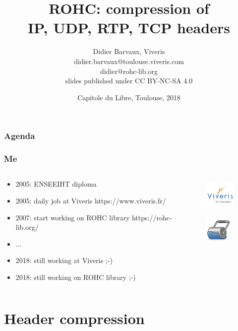 \documentclass[utf8]{beamer}
\title{ROHC: compression of \\IP, UDP, RTP, TCP headers}
\author[Viveris]{Didier Barvaux, Viveris \\ {\tiny didier.barvaux@toulouse.viveris.com} \\ {\tiny didier@rohc-lib.org} \\ {\tiny slides published under CC BY-NC-SA 4.0}}
\date[Formation]{Capitole du Libre, Toulouse, 2018}
\begin{document}
\begin{frame}
		\titlepage
\end{frame}

\begin{frame}
	\frametitle{Agenda}
	\tableofcontents[hideallsubsections]
\end{frame}

\begin{frame}
	\frametitle{Me}
	\begin{block}{}
		\begin{columns}
			\begin{column}[T]{75mm}
				\begin{itemize}
					\item 2005: ENSEEIHT diploma
					\item 2005: daily job at Viveris {\tiny https://www.viveris.fr/}
					\item 2007: start working on ROHC library {\tiny https://rohc-lib.org/}
					\item ...
					\item 2018: still working at Viveris ;-)
					\item 2018: still working on ROHC library ;-)
				\end{itemize}
			\end{column}
			\begin{column}[T]{25mm}
				\begin{figure}
					\includegraphics[height=15mm]{images/viveris_logo.png}
				\end{figure}
				\begin{figure}
					\includegraphics[height=13mm]{images/rohc_logo.png}
				\end{figure}
			\end{column}
		\end{columns}
	\end{block}
\end{frame}




\section{Header compression}
\end{document}
